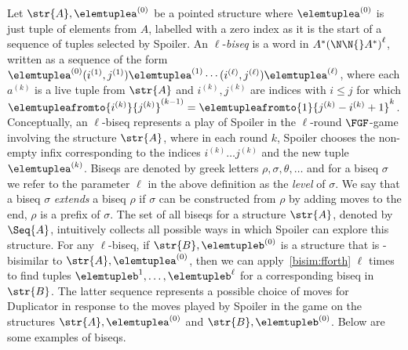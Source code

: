 Let $\str{A}, \elemtuplea^{(0)}$ be a pointed structure where $\elemtuplea^{(0)}$ is just tuple of elements from $A$, labelled with a zero index as it is the start of a sequence of tuples selected by Spoiler.
An $\ell$-\emph{biseq} is a word in $A^*{(\N\N{}A^{*})}^{\ell}$, written as a sequence of the form $\elemtuplea^{(0)}(i^{(1)}, j^{(1)})\elemtuplea^{(1)}\cdots(i^{(\ell)}, j^{(\ell)})\elemtuplea^{(\ell)}$, where each $a^{(k)}$ is a live tuple from $\str{A}$ and $i^{(k)}, j^{(k)}$ are indices with $i \le j$ for which $\elemtupleafromto{i^{(k)}}{j^{(k)}}^{(k-1)} = \elemtupleafromto{1}{j^{(k)}-i^{(k)}+1}^{k}$.
Conceptually, an $\ell$-biseq represents a play of Spoiler in the $\ell$-round $\FGF$-game involving the structure $\str{A}$, where in each round $k$, Spoiler chooses the non-empty infix corresponding to the indices $i^{(k)}\ldots{}j^{(k)}$ and the new tuple $\elemtuplea^{(k)}$.
Biseqs are denoted by greek letters $\rho, \sigma, \theta, \ldots$ and for
a biseq $\sigma$ we refer to the parameter $\ell$ in the above definition as the \emph{level} of $\sigma$.
We say that a biseq $\sigma$ \emph{extends} a biseq $\rho$ if $\sigma$ can be constructed from $\rho$ by adding moves to the end, \ie{} $\rho$ is a prefix of $\sigma$.
The set of all biseqs for a structure $\str{A}$, denoted by $\Seq{A}$, intuitively collects all possible ways in which Spoiler can explore this structure.
For any $\ell$-biseq, if $\str{B}, \elemtupleb^{(0)}$ is a structure that is \FGF-bisimilar to $\str{A}, \elemtuplea^{(0)}$, then we can apply~\ref{bisim:fforth} $\ell$ times to find tuples $\elemtupleb^{1}, \ldots, \elemtupleb^{\ell}$ for a corresponding biseq in $\str{B}$.
The latter sequence represents a possible choice of moves for Duplicator in response to the moves played by Spoiler in the game on the structures $\str{A}, \elemtuplea^{(0)}$ and $\str{B}, \elemtupleb^{(0)}$.
Below are some examples of biseqs.
